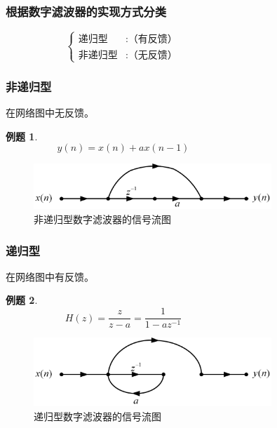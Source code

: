 \documentclass[notheorems,compress,mathserif,table]{beamer}
\newtheorem{example}{例题}
\begin{document}
\begin{frame}[shrink]\frametitle{根据数字滤波器的实现方式分类}%
$$
\left\{ \begin{aligned}
\mbox{递归型} &: \mbox{（有反馈）} \quad\quad\quad\quad\quad\quad\quad\quad\quad\quad\quad\quad\\
\mbox{非递归型} &:\mbox{（无反馈）}
\end{aligned} \right.
$$
\end{frame}
\begin{frame}\frametitle{非递归型}%
    在网络图中无反馈。
    \begin{example}
    $$y(n)=x(n)+ax(n-1)\quad\quad\quad\quad\quad\quad\quad\quad\quad\quad\quad\quad$$
    \end{example}
    \begin{figure}[h]
    \centering
    \includegraphics[width=0.8\textwidth]{feidigui.jpg}
    \caption{非递归型数字滤波器的信号流图}
    \label{chp5:jibenliutu}
    \end{figure}
\end{frame}
\begin{frame}\frametitle{递归型}%
\par 在网络图中有反馈。
\begin{example}
$$H(z)=\frac{z}{z-a}=\frac{1}{1-az^{-1}}\quad\quad\quad\quad\quad\quad\quad\quad\quad\quad\quad\quad$$
\end{example}
\begin{figure}[h]
\centering
\includegraphics[width=0.8\textwidth]{digui.jpg}
\caption{递归型数字滤波器的信号流图}
\label{chp5:jibenliutu}
\end{figure}
\end{frame}
\end{document}
